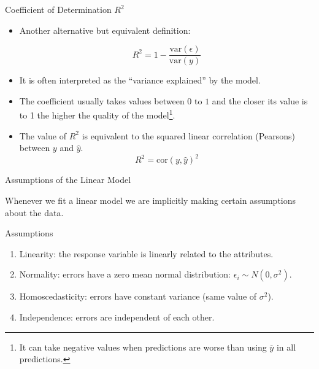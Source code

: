 \documentclass[handout]{beamer}
\begin{document}
\begin{frame}{Coefficient of Determination $R^2$}
\scriptsize{
\begin{itemize}
 
 \item Another alternative but equivalent definition:
 
   \begin{equation}
  R^2= 1-\frac{\text{var}(\epsilon)}{\text{var}(y)} 
 \end{equation}

 \item It is often interpreted as the ``variance explained'' by the model.
 
 \item The coefficient usually takes values between $0$ to $1$ and the closer its value is to 1 the higher the quality of the model\footnote{It can take negative values when predictions are worse than using $\overline{y}$ in all predictions.}.
 
 \item The value of $R^2$ is equivalent to the squared linear correlation (Pearsons) between $y$ and $\hat{y}$.
\begin{displaymath}
 R^2=\text{cor}(y,\hat{y})^2
\end{displaymath}
  
\end{itemize}


}
\end{frame}



\begin{frame}{Assumptions of the Linear Model}
\scriptsize{





Whenever we fit a linear model we are implicitly making certain assumptions about the data.  


\begin{block}{Assumptions}
\begin{enumerate}
\item Linearity: the response variable is linearly related to the attributes. 
\item  Normality: errors have a zero mean normal distribution: $\epsilon_{i} \sim N(0,\sigma^2)$.
\item Homoscedasticity: errors have constant variance (same value of $\sigma^2$).
\item Independence: errors are independent of each other.
 
\end{enumerate}
 
\end{block}

} 
\end{frame}
\end{document}
